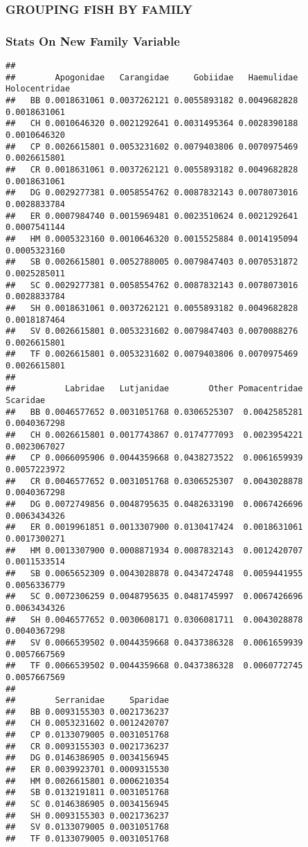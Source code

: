 \documentclass[
]{article}
\begin{document}
\hypertarget{grouping-fish-by-family}{%
\subsubsection{GROUPING FISH BY FAMILY}\label{grouping-fish-by-family}}

\hypertarget{stats-on-new-family-variable}{%
\subsubsection{Stats On New Family
Variable}\label{stats-on-new-family-variable}}

\begin{verbatim}
##     
##        Apogonidae   Carangidae     Gobiidae   Haemulidae Holocentridae
##   BB 0.0018631061 0.0037262121 0.0055893182 0.0049682828  0.0018631061
##   CH 0.0010646320 0.0021292641 0.0031495364 0.0028390188  0.0010646320
##   CP 0.0026615801 0.0053231602 0.0079403806 0.0070975469  0.0026615801
##   CR 0.0018631061 0.0037262121 0.0055893182 0.0049682828  0.0018631061
##   DG 0.0029277381 0.0058554762 0.0087832143 0.0078073016  0.0028833784
##   ER 0.0007984740 0.0015969481 0.0023510624 0.0021292641  0.0007541144
##   HM 0.0005323160 0.0010646320 0.0015525884 0.0014195094  0.0005323160
##   SB 0.0026615801 0.0052788005 0.0079847403 0.0070531872  0.0025285011
##   SC 0.0029277381 0.0058554762 0.0087832143 0.0078073016  0.0028833784
##   SH 0.0018631061 0.0037262121 0.0055893182 0.0049682828  0.0018187464
##   SV 0.0026615801 0.0053231602 0.0079847403 0.0070088276  0.0026615801
##   TF 0.0026615801 0.0053231602 0.0079403806 0.0070975469  0.0026615801
##     
##          Labridae   Lutjanidae        Other Pomacentridae     Scaridae
##   BB 0.0046577652 0.0031051768 0.0306525307  0.0042585281 0.0040367298
##   CH 0.0026615801 0.0017743867 0.0174777093  0.0023954221 0.0023067027
##   CP 0.0066095906 0.0044359668 0.0438273522  0.0061659939 0.0057223972
##   CR 0.0046577652 0.0031051768 0.0306525307  0.0043028878 0.0040367298
##   DG 0.0072749856 0.0048795635 0.0482633190  0.0067426696 0.0063434326
##   ER 0.0019961851 0.0013307900 0.0130417424  0.0018631061 0.0017300271
##   HM 0.0013307900 0.0008871934 0.0087832143  0.0012420707 0.0011533514
##   SB 0.0065652309 0.0043028878 0.0434724748  0.0059441955 0.0056336779
##   SC 0.0072306259 0.0048795635 0.0481745997  0.0067426696 0.0063434326
##   SH 0.0046577652 0.0030608171 0.0306081711  0.0043028878 0.0040367298
##   SV 0.0066539502 0.0044359668 0.0437386328  0.0061659939 0.0057667569
##   TF 0.0066539502 0.0044359668 0.0437386328  0.0060772745 0.0057667569
##     
##        Serranidae     Sparidae
##   BB 0.0093155303 0.0021736237
##   CH 0.0053231602 0.0012420707
##   CP 0.0133079005 0.0031051768
##   CR 0.0093155303 0.0021736237
##   DG 0.0146386905 0.0034156945
##   ER 0.0039923701 0.0009315530
##   HM 0.0026615801 0.0006210354
##   SB 0.0132191811 0.0031051768
##   SC 0.0146386905 0.0034156945
##   SH 0.0093155303 0.0021736237
##   SV 0.0133079005 0.0031051768
##   TF 0.0133079005 0.0031051768
\end{verbatim}
\end{document}
